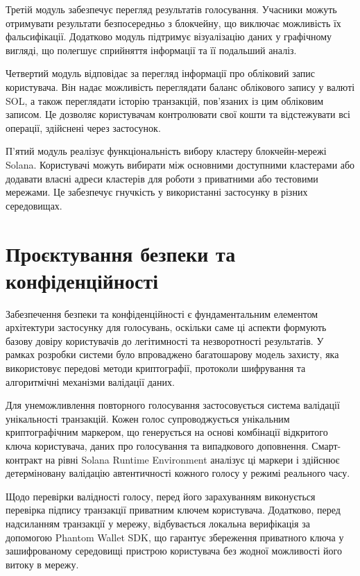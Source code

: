 \documentclass[14pt]{extreport}
\begin{document}
  Третій модуль забезпечує перегляд результатів голосування. Учасники можуть отримувати результати безпосередньо з блокчейну, що виключає можливість їх фальсифікації. Додатково модуль підтримує візуалізацію даних у графічному вигляді, що полегшує сприйняття інформації та її подальший аналіз.

  Четвертий модуль відповідає за перегляд інформації про обліковий запис користувача. Він надає можливість переглядати баланс облікового запису у валюті SOL, а також переглядати історію транзакцій, пов'язаних із цим обліковим записом. Це дозволяє користувачам контролювати свої кошти та відстежувати всі операції, здійснені через застосунок.

  П'ятий модуль реалізує функціональність вибору кластеру блокчейн-мережі Solana. Користувачі можуть вибирати між основними доступними кластерами або додавати власні адреси кластерів для роботи з приватними або тестовими мережами. Це забезпечує гнучкість у використанні застосунку в різних середовищах.
  
  \section{Проєктування безпеки та конфіденційності}
  
  Забезпечення безпеки та конфіденційності є фундаментальним елементом архітектури застосунку для голосувань, оскільки саме ці аспекти формують базову довіру користувачів до легітимності та незворотності результатів. У рамках розробки системи було впроваджено багатошарову модель захисту, яка використовує передові методи криптографії, протоколи шифрування та алгоритмічні механізми валідації даних.

  Для унеможливлення повторного голосування застосовується система валідації унікальності транзакцій. Кожен голос супроводжується унікальним криптографічним маркером, що генерується на основі комбінації відкритого ключа користувача, даних про голосування та випадкового доповнення. Смарт-контракт на рівні Solana Runtime Environment аналізує ці маркери і здійснює детерміновану валідацію автентичності кожного голосу у режимі реального часу.

  Щодо перевірки валідності голосу, перед його зарахуванням виконується перевірка підпису транзакції приватним ключем користувача. Додатково, перед надсиланням транзакції у мережу, відбувається локальна верифікація за допомогою Phantom Wallet SDK, що гарантує збереження приватного ключа у зашифрованому середовищі пристрою користувача без жодної можливості його витоку в мережу.
\end{document}
